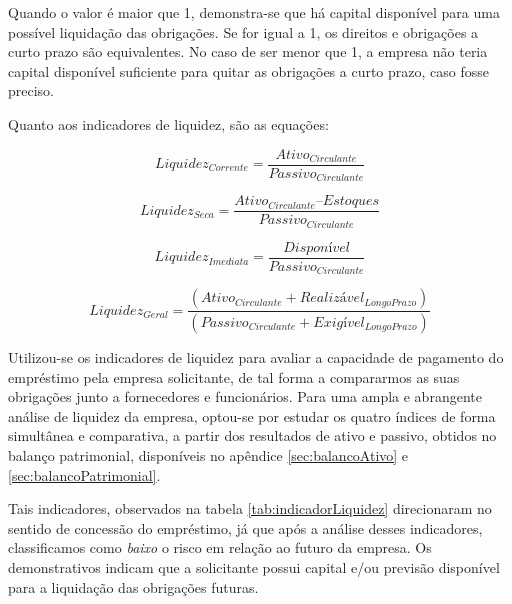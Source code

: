 Quando o valor é maior que 1, demonstra-se que há capital disponível para uma possível liquidação das obrigações. Se for igual a 1, os direitos e obrigações a curto prazo são equivalentes. No caso de ser menor que 1, a empresa não teria capital disponível suficiente para quitar as obrigações a curto prazo, caso fosse preciso.

Quanto aos indicadores de liquidez, são as equações:

\begin{equation}
  Liquidez_{Corrente}=\frac{Ativo_{Circulante}}{Passivo_{Circulante}}
  \label{eq:liquidezcorrente}
\end{equation}

\begin{equation}
  Liquidez_{Seca} = \frac{Ativo_{Circulante} – Estoques}{Passivo_{Circulante}}
  \label{eq:liquidezseca}
\end{equation}

\begin{equation}
  Liquidez_{Imediata} = \frac{{Disponível}}{Passivo_{Circulante}}
  \label{eq:liquidezseca}
\end{equation}

\begin{equation}
  Liquidez_{Geral} = \frac{(Ativo_{Circulante} + Realizável_{Longo Prazo})}{(Passivo_{Circulante} + Exigível_{Longo Prazo})}
  \label{eq:liquidezgeral}
\end{equation}

Utilizou-se os indicadores de liquidez para avaliar a capacidade de pagamento do empréstimo pela empresa solicitante, de tal forma a compararmos as suas obrigações junto a fornecedores e funcionários. Para uma ampla e abrangente análise de liquidez da empresa, optou-se por estudar os quatro índices de forma simultânea e comparativa, a partir dos resultados de ativo e passivo, obtidos no balanço patrimonial, disponíveis no apêndice \ref{sec:balancoAtivo} e \ref{sec:balancoPatrimonial}.

Tais indicadores, observados na tabela \ref{tab:indicadorLiquidez} direcionaram no sentido de concessão do empréstimo, já que após a análise desses indicadores, classificamos como \emph{baixo} o risco em relação ao futuro da empresa. Os demonstrativos indicam que a solicitante possui capital e/ou previsão disponível para a liquidação das obrigações futuras.
